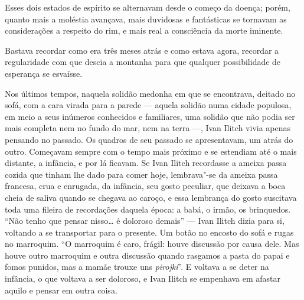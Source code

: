 Esses dois estados de espírito se alternavam desde o começo da doença;
porém, quanto mais a moléstia avançava, mais duvidosas e fantásticas se
tornavam as considerações a respeito do rim, e mais real a consciência
da morte iminente.

Bastava recordar como era três meses atrás e como estava agora, recordar
a regularidade com que descia a montanha para que qualquer possibilidade
de esperança se esvaísse.

Nos últimos tempos, naquela solidão medonha em que se encontrava,
deitado no sofá, com a cara virada para a parede --- aquela solidão numa
cidade populosa, em meio a seus inúmeros conhecidos e familiares, uma
solidão que não podia ser mais completa nem no fundo do mar, nem na
terra ---, Ivan Ilitch vivia apenas pensando no passado. Os quadros de seu
passado se apresentavam, um atrás do outro. Começavam sempre com o tempo
mais próximo e se estendiam até o mais distante, a infância, e por lá
ficavam. Se Ivan Ilitch recordasse a ameixa passa cozida que tinham lhe
dado para comer hoje, lembrava"-se da ameixa passa francesa, crua e
enrugada, da infância, seu gosto peculiar, que deixava a boca cheia de
saliva quando se chegava ao caroço, e essa lembrança do gosto suscitava
toda uma fileira de recordações daquela época: a babá, o irmão, os
brinquedos. ``Não tenho que pensar nisso\ldots{} é doloroso demais'' --- Ivan
Ilitch dizia para si, voltando a se transportar para o presente. Um
botão no encosto do sofá e rugas no marroquim. ``O marroquim é caro,
frágil: houve discussão por causa dele. Mas houve outro marroquim e
outra discussão quando rasgamos a pasta do papai e fomos punidos, mas a
mamãe trouxe uns \emph{pirojkí}''. E voltava a se deter na infância, o
que voltava a ser doloroso, e Ivan Ilitch se empenhava em afastar aquilo
e pensar em outra coisa.

